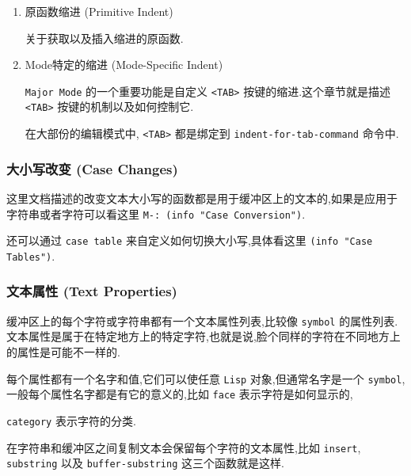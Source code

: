 \documentclass[11pt]{article}
\begin{document}
\begin{enumerate}
\item 原函数缩进 (Primitive Indent)
\label{sec:org33a5625}

关于获取以及插入缩进的原函数.


\item Mode特定的缩进 (Mode-Specific Indent)
\label{sec:orgf1a2a39}

\texttt{Major Mode} 的一个重要功能是自定义 \texttt{<TAB>} 按键的缩进.这个章节就是描述 \texttt{<TAB>} 按键的机制以及如何控制它.

在大部份的编辑模式中, \texttt{<TAB>} 都是绑定到 \texttt{indent-for-tab-command} 命令中.
\end{enumerate}


\subsubsection{大小写改变 (Case Changes)}
\label{sec:org39490ff}

这里文档描述的改变文本大小写的函数都是用于缓冲区上的文本的,如果是应用于字符串或者字符可以看这里 \texttt{M-: (info "Case Conversion")}.

还可以通过 \texttt{case table} 来自定义如何切换大小写,具体看这里 \texttt{(info "Case Tables")}.


\subsubsection{文本属性 (Text Properties)}
\label{sec:orge68d58f}

缓冲区上的每个字符或字符串都有一个文本属性列表,比较像 \texttt{symbol} 的属性列表.文本属性是属于在特定地方上的特定字符,也就是说,脸个同样的字符在不同地方上的属性是可能不一样的.

每个属性都有一个名字和值,它们可以使任意 \texttt{Lisp} 对象,但通常名字是一个 \texttt{symbol},一般每个属性名字都是有它的意义的,比如 \texttt{face} 表示字符是如何显示的,

\texttt{category} 表示字符的分类.

在字符串和缓冲区之间复制文本会保留每个字符的文本属性,比如 \texttt{insert}, \texttt{substring} 以及 \texttt{buffer-substring} 这三个函数就是这样.
\end{document}
